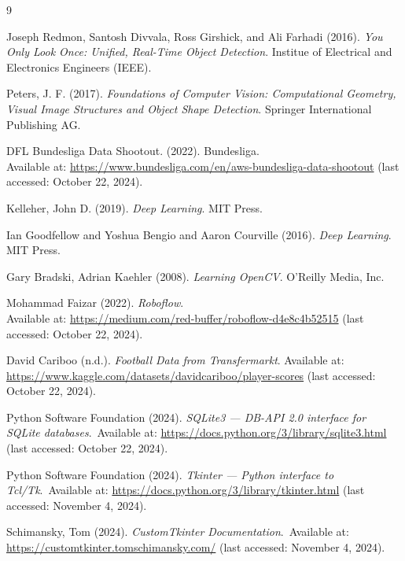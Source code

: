 \documentclass{article}
\begin{document}
\pagebreak

\begin{thebibliography}{9}

Joseph Redmon, Santosh Divvala, Ross Girshick, and Ali Farhadi (2016). \textit{You Only Look Once: Unified, Real-Time Object Detection}. Institue of Electrical and Electronics Engineers (IEEE).

Peters, J. F. (2017). \textit{Foundations of Computer Vision: Computational Geometry, Visual Image Structures and Object Shape Detection}. Springer International Publishing AG.

DFL Bundesliga Data Shootout. (2022). {Bundesliga}.\\ Available at: \url{https://www.bundesliga.com/en/aws-bundesliga-data-shootout} (last accessed: October 22, 2024).

Kelleher, John D. (2019). \textit{Deep Learning}. MIT Press.

Ian Goodfellow and Yoshua Bengio and Aaron Courville (2016). \textit{Deep Learning}. MIT Press.

Gary Bradski, Adrian Kaehler (2008). \textit{Learning OpenCV}. O'Reilly Media, Inc.

Mohammad Faizar (2022). \textit{Roboflow}.\\ Available at: \url{https://medium.com/red-buffer/roboflow-d4e8c4b52515} (last accessed: October 22, 2024).

David Cariboo (n.d.). \textit{Football Data from Transfermarkt}. Available at: \url{https://www.kaggle.com/datasets/davidcariboo/player-scores} (last accessed: October 22, 2024).

 Python Software Foundation (2024). \textit{SQLite3 — DB-API 2.0 interface for SQLite databases}.\ Available at: \url{https://docs.python.org/3/library/sqlite3.html} (last accessed: October 22, 2024).

 Python Software Foundation (2024). \textit{Tkinter — Python interface to Tcl/Tk}.\ Available at: \url{https://docs.python.org/3/library/tkinter.html} (last accessed: November 4, 2024).

 Schimansky, Tom (2024). \textit{CustomTkinter Documentation}.\ Available at: \url{https://customtkinter.tomschimansky.com/} (last accessed: November 4, 2024).

\end{thebibliography} 
\end{document}
